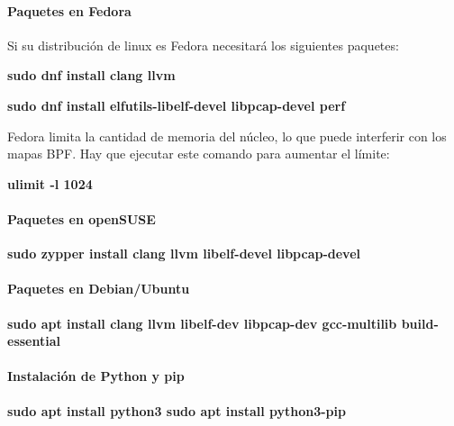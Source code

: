 \paragraph{Paquetes en Fedora}

Si su distribución de linux es Fedora necesitará los siguientes paquetes:

\begin{center}
    \textbf{sudo dnf install clang llvm}
\end{center}
\begin{center}
    \textbf{sudo dnf install elfutils-libelf-devel libpcap-devel perf}
\end{center}
Fedora limita la cantidad de memoria del núcleo, lo que puede interferir con los mapas BPF. Hay que ejecutar este comando para aumentar el límite:
\begin{center}
    \textbf{ulimit -l 1024}
\end{center}

\paragraph{Paquetes en openSUSE}

\begin{center}
    \textbf{sudo zypper install clang llvm libelf-devel libpcap-devel}
\end{center}
\paragraph{Paquetes en Debian/Ubuntu}
\begin{center}
    \textbf{sudo apt install clang llvm libelf-dev libpcap-dev gcc-multilib build-essential}
\end{center}

\paragraph{Instalación de Python y pip}

\begin{center}
    \textbf{sudo apt install python3
sudo apt install python3-pip}
\end{center}
